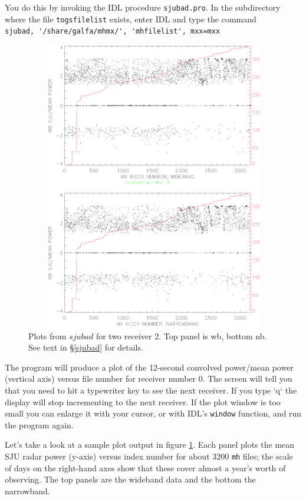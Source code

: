 \documentclass[psfig,preprint]{aastex}
\begin{document}
	You do this by invoking the IDL procedure \verb$sjubad.pro$.
In the subdirectory where the file \verb$togsfilelist$ exists, enter IDL 
and type the command \\
\verb$sjubad, '/share/galfa/mhmx/', 'mhfilelist', mxx=mxx$ 

\begin{figure}[!h]
\begin{center}
\includegraphics[height=5in,width=7in]{sjubad.ps}
\end{center}
\caption{Plots from $sjubad$ for two receiver 2. 
Top panel is wb, bottom nb. See text in \S \ref{sjubad}
for details. \label{sjubadps}}
\end{figure}

	The program will produce a plot of the 12-second convolved
power/mean power (vertical axis) versus file number for receiver number
0.  The screen will tell you that you need to hit a typewriter key to
see the next receiver.  If you type `q` the display will stop
incrementing to the next receiver.  If the plot window is too small you
can enlarge it with your cursor, or with IDL's \verb$window$ function,
and run the program again. 

	Let's take a look at a sample plot output in figure
\ref{sjubadps}.  Each panel plots the mean SJU radar power (y-axis)
versus index number for about 3200 \verb$mh$ files; the scale of days on
the right-hand axes show that these cover almost a year's worth of
observing.  The top panels are the wideband data and the bottom the
narrowband. 
\end{document}
